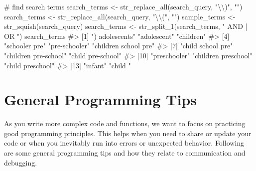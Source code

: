 \documentclass[
  letterpaper,
]{latex/krantz}
\makeatletter
\newenvironment{Shaded}{\begin{snugshade}}{\end{snugshade}}
\newcommand{\CommentTok}[1]{\textcolor[rgb]{0.37,0.37,0.37}{#1}}
\newcommand{\FunctionTok}[1]{\textcolor[rgb]{0.28,0.35,0.67}{#1}}
\newcommand{\NormalTok}[1]{\textcolor[rgb]{0.00,0.23,0.31}{#1}}
\newcommand{\OtherTok}[1]{\textcolor[rgb]{0.00,0.23,0.31}{#1}}
\newcommand{\SpecialCharTok}[1]{\textcolor[rgb]{0.37,0.37,0.37}{#1}}
\newcommand{\StringTok}[1]{\textcolor[rgb]{0.13,0.47,0.30}{#1}}
\newenvironment{kframe}{%
\medskip{}
\setlength{\fboxsep}{.8em}
 \def\at@end@of@kframe{}%
 \ifinner\ifhmode%
  \def\at@end@of@kframe{\end{minipage}}%
  \begin{minipage}{\columnwidth}%
 \fi\fi%
 \def\FrameCommand##1{\hskip\@totalleftmargin \hskip-\fboxsep
 \colorbox{shadecolor}{##1}\hskip-\fboxsep
     \hskip-\linewidth \hskip-\@totalleftmargin \hskip\columnwidth}%
 \MakeFramed {\advance\hsize-\width
   \@totalleftmargin\z@ \linewidth\hsize
   \@setminipage}}%
 {\par\unskip\endMakeFramed%
 \at@end@of@kframe}
\renewenvironment{Shaded}{\begin{kframe}}{\end{kframe}}
\makeatother
\begin{document}
\begin{Shaded}
\begin{Highlighting}[]
\CommentTok{\# find search terms}
\NormalTok{search\_terms }\OtherTok{\textless{}{-}} \FunctionTok{str\_replace\_all}\NormalTok{(search\_query, }\StringTok{"}\SpecialCharTok{\textbackslash{}\textbackslash{}}\StringTok{)"}\NormalTok{, }\StringTok{""}\NormalTok{)}
\NormalTok{search\_terms }\OtherTok{\textless{}{-}} \FunctionTok{str\_replace\_all}\NormalTok{(search\_query, }\StringTok{"}\SpecialCharTok{\textbackslash{}\textbackslash{}}\StringTok{("}\NormalTok{, }\StringTok{""}\NormalTok{)}
\NormalTok{sample\_terms }\OtherTok{\textless{}{-}} \FunctionTok{str\_squish}\NormalTok{(search\_query)}
\NormalTok{search\_terms }\OtherTok{\textless{}{-}} \FunctionTok{str\_split\_1}\NormalTok{(search\_terms, }\StringTok{" AND | OR "}\NormalTok{)}
\NormalTok{search\_terms}
\CommentTok{\#\textgreater{}  [1] ") adolescents"       "adolescent"          "children"           }
\CommentTok{\#\textgreater{}  [4] "schooler pre"        "pre{-}schooler"        "children school pre"}
\CommentTok{\#\textgreater{}  [7] "child school pre"    "children pre{-}school" "child pre{-}school"   }
\CommentTok{\#\textgreater{} [10] "preschooler"         "children preschool"  "child preschool"    }
\CommentTok{\#\textgreater{} [13] "infant"              "child "}
\end{Highlighting}
\end{Shaded}

\section{\texorpdfstring{General Programming Tips
}{General Programming Tips }}\label{general-programming-tips}

As you write more complex code and functions, we want to focus on
practicing good programming principles. This helps when you need to
share or update your code or when you inevitably run into errors or
unexpected behavior. Following are some general programming tips and how
they relate to communication and debugging.
\end{document}
